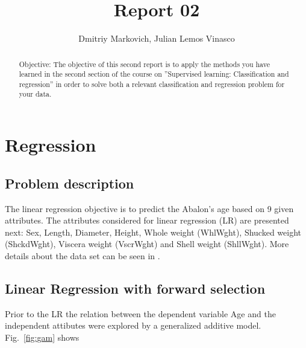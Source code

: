 \documentclass[10pt, paper=a4]{article}
\begin{document}
\title{Report 02}

\author{ Dmitriy Markovich, Julian Lemos Vinasco}

\date{}

\maketitle

\begin{abstract}
  Objective: The objective of this second report is to apply the
  methods you have learned in the second section of the course on
  ”Supervised learning: Classification and regression” in order to
  solve both a relevant classification and regression problem for your
  data.
\end{abstract}

\section{Regression}
\label{sec:regression}

\subsection{Problem description}
The linear regression objective is to predict the Abalon's age based on 9 given attributes. The attributes considered for linear regression (LR) are presented next: Sex, Length, Diameter, Height, Whole weight (WhlWght), Shucked weight (ShckdWght), Viscera weight (VscrWght) and Shell weight (ShllWght). More details about the data set can be seen in \cite{datadescription}.

\subsection{Linear Regression with forward selection}
Prior to the LR the relation between the dependent variable Age and the independent attibutes were explored by a generalized additive model. Fig.~\ref{fig:gam} shows 
\end{document}
